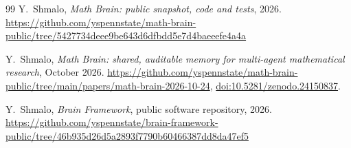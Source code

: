 \documentclass[11pt]{article}
\theoremstyle{remark}
\providecommand{\doi}[1]{\href{https://doi.org/#1}{doi:#1}}
\begin{document}
\begin{thebibliography}{99}
Y.~Shmalo, \emph{Math Brain: public snapshot, code and tests}, 2026.
\url{https://github.com/yspennstate/math-brain-public/tree/5427734deee9be643d6dfbdd5e7d4baeeefe4a4a}

Y.~Shmalo, \emph{Math Brain: shared, auditable memory for multi-agent mathematical research}, October 2026.
\url{https://github.com/yspennstate/math-brain-public/tree/main/papers/math-brain-2026-10-24},
\doi{10.5281/zenodo.24150837}.

Y.~Shmalo, \emph{Brain Framework}, public software repository, 2026.
\url{https://github.com/yspennstate/brain-framework-public/tree/46b935d26d5a2893f7790b60466387dd8da47ef5}

\end{thebibliography}
\end{document}
